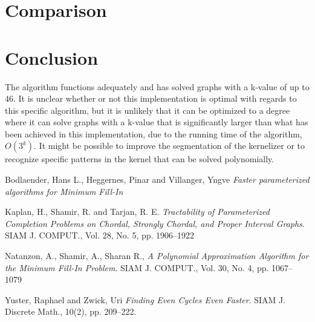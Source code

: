 \documentclass{article}
\begin{document}
	\section{Comparison}

	\section{Conclusion}
	The algorithm functions adequately and has solved graphs with a k-value of up to 46.
	It is unclear whether or not this implementation is optimal with regards to this specific algorithm, but it is unlikely that it can be optimized to a degree where it can solve graphs with a k-value that is significantly larger than what has been achieved in this implementation, due to the running time of the algorithm, $O(3^k)$.
	It might be possible to improve the segmentation of the kernelizer or to recognize specific patterns in the kernel that can be solved polynomially.

	\pagebreak
	
	\begin{thebibliography}{9}

		Bodlaender, Hans L., Heggernes, Pinar and Villanger, Yngve
		\textit{Faster parameterized algorithms for Minimum Fill-In}

		Kaplan, H., Shamir, R. and Tarjan, R. E. 
		\textit{Tractability of Parameterized Completion Problems on Chordal, Strongly Chordal, and Proper Interval Graphs}. 
		SIAM J. COMPUT., Vol. 28, No. 5, pp. 1906--1922

		Natanzon, A., Shamir, A., Sharan R.,
		\textit{A Polynomial Approximation Algorithm for the Minimum Fill-In Problem}. 
 		SIAM J. COMPUT., Vol. 30, No. 4, pp. 1067--1079

		Yuster, Raphael and Zwick, Uri
		\textit{Finding Even Cycles Even Faster}.
		SIAM J. Discrete Math., 10(2), pp. 209--222.		
		
	\end{thebibliography}

	\clearpage
\end{document}
